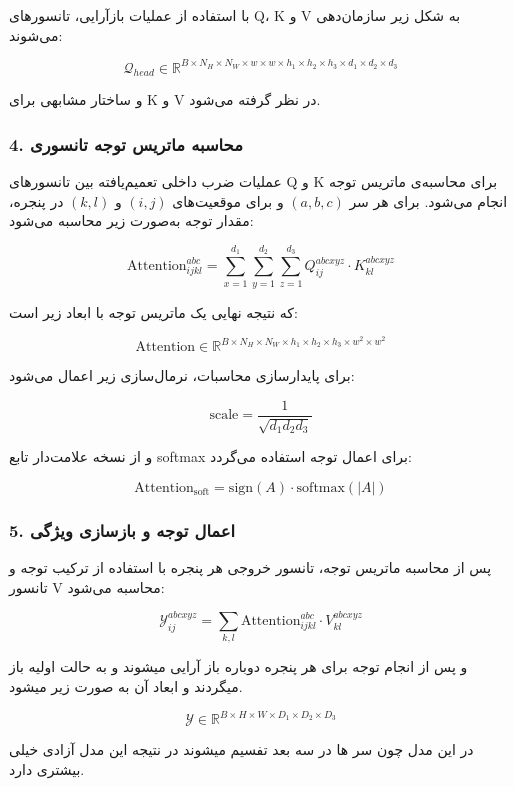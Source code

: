 با استفاده از عملیات بازآرایی، تانسورهای Q، K و V به شکل زیر سازمان‌دهی می‌شوند:

\[
\mathcal{Q}_{head} \in \mathbb{R}^{B \times N_H \times N_W \times w \times w \times h_1 \times h_2 \times h_3 \times d_1 \times d_2 \times d_3}
\]

و ساختار مشابهی برای K و V در نظر گرفته می‌شود.

\subsubsection*{4. محاسبه ماتریس توجه تانسوری}

عملیات ضرب داخلی تعمیم‌یافته بین تانسورهای Q و K برای محاسبه‌ی ماتریس توجه انجام می‌شود. برای هر سر $(a,b,c)$ و برای موقعیت‌های $(i,j)$ و $(k,l)$ در پنجره، مقدار توجه به‌صورت زیر محاسبه می‌شود:

\[
\text{Attention}_{ijkl}^{abc} = \sum_{x=1}^{d_1} \sum_{y=1}^{d_2} \sum_{z=1}^{d_3} Q_{ij}^{abcxyz} \cdot K_{kl}^{abcxyz}
\]

که نتیجه نهایی یک ماتریس توجه با ابعاد زیر است:

\[
\text{Attention} \in \mathbb{R}^{B \times N_H \times N_W \times h_1 \times h_2 \times h_3 \times w^2 \times w^2}
\]

برای پایدارسازی محاسبات، نرمال‌سازی زیر اعمال می‌شود:

\[
\text{scale} = \frac{1}{\sqrt{d_1 d_2 d_3}}
\]

و از نسخه علامت‌دار تابع softmax برای اعمال توجه استفاده می‌گردد:

\[
\text{Attention}_{\text{soft}} = \text{sign}(A) \cdot \text{softmax}(|A|)
\]

\subsubsection*{5. اعمال توجه و بازسازی ویژگی}

پس از محاسبه ماتریس توجه، تانسور خروجی هر پنجره با استفاده از ترکیب توجه و تانسور V محاسبه می‌شود:

\[
\mathcal{Y}_{ij}^{abcxyz} = \sum_{k,l} \text{Attention}_{ijkl}^{abc} \cdot V_{kl}^{abcxyz}
\]

و پس از انجام توجه برای هر پنجره دوباره باز آرایی میشوند و به حالت اولیه باز میگردند و ابعاد آن به صورت زیر میشود.

\[
\mathcal{Y} \in \mathbb{R}^{B \times H \times W \times D_1 \times D_2 \times D_3}
\]

در این مدل چون سر ها در سه بعد تفسیم میشوند در نتیجه این مدل آزادی خیلی بیشتری دارد.






